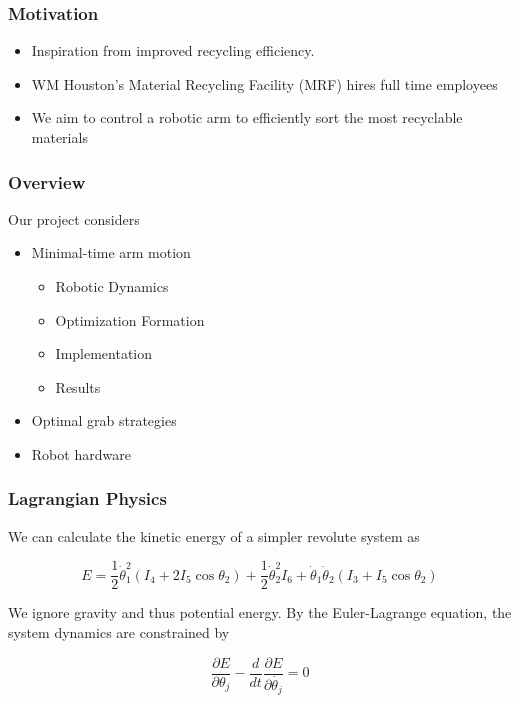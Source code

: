 \documentclass{beamer}
\begin{document}
\begin{frame}
\frametitle{Motivation}

\begin{itemize}
\item Inspiration from improved recycling efficiency. 
\item WM Houston's Material Recycling Facility (MRF) hires full time employees
\item We aim to control a robotic arm to efficiently sort the most recyclable materials
\end{itemize}

\end{frame}

\begin{frame}
\frametitle{Overview}

Our project considers 
\begin{itemize}
\item Minimal-time arm motion 
\begin{itemize}
\item Robotic Dynamics
\item Optimization Formation
\item Implementation
\item Results
\end{itemize}
\item Optimal grab strategies
\item Robot hardware
\end{itemize}

\end{frame}



\begin{frame}
\frametitle{Lagrangian Physics}
We can calculate the kinetic energy of a simpler revolute system as
	
\begin{equation}
	E = \frac{1}{2}\dot\theta_1^2(I_4 + 2I_5\cos\theta_2)
	+ \frac{1}{2}\dot\theta_2^2I_6
	+ \dot\theta_1\dot\theta_2(I_3 + I_5 \cos\theta_2)
\end{equation}

We ignore gravity and thus potential energy. By the Euler-Lagrange equation, the system
dynamics are constrained by

\begin{equation}
	\frac{\partial E}{\partial \theta_j} - 
	\frac{d}{dt}\frac{\partial E}{\partial \dot{\theta_j}} = 0
\end{equation}


\end{frame}
\end{document}
